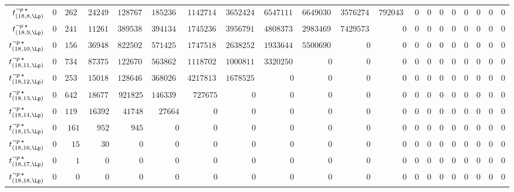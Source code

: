 \begin{tabular}{r|rrrrrrrrrrrrrrrrrrr}
  $t^{\neg p \, \star}_{(18,8,\Lp)}$ & $0$ & $262171$ & $242493998$ & $12876768081$ & $185236211948$ & $1142714990240$ & $3652424436036$ & $6547111209163$ & $6649030529816$ & $3576274175646$ & $792043926300$ & $0$ & $0$ & $0$ & $0$ & $0$ & $0$ & $0$ & $0$ \\
  $t^{\neg p \, \star}_{(18,9,\Lp)}$ & $0$ & $241011$ & $112613104$ & $3895382535$ & $39413459324$ & $174523685160$ & $395679143724$ & $480837309029$ & $298346954392$ & $74295734409$ & $0$ & $0$ & $0$ & $0$ & $0$ & $0$ & $0$ & $0$ & $0$ \\
  $t^{\neg p \, \star}_{(18,10,\Lp)}$ & $0$ & $156446$ & $36948668$ & $822502023$ & $5714250772$ & $17475187350$ & $26382522396$ & $19336444092$ & $5500690560$ & $0$ & $0$ & $0$ & $0$ & $0$ & $0$ & $0$ & $0$ & $0$ & $0$ \\
  $t^{\neg p \, \star}_{(18,11,\Lp)}$ & $0$ & $73472$ & $8737572$ & $122670621$ & $563862860$ & $1118702910$ & $1000811484$ & $332025078$ & $0$ & $0$ & $0$ & $0$ & $0$ & $0$ & $0$ & $0$ & $0$ & $0$ & $0$ \\
  $t^{\neg p \, \star}_{(18,12,\Lp)}$ & $0$ & $25305$ & $1501890$ & $12864672$ & $36802672$ & $42178130$ & $16785252$ & $0$ & $0$ & $0$ & $0$ & $0$ & $0$ & $0$ & $0$ & $0$ & $0$ & $0$ & $0$ \\
  $t^{\neg p \, \star}_{(18,13,\Lp)}$ & $0$ & $6427$ & $186776$ & $921825$ & $1463396$ & $727675$ & $0$ & $0$ & $0$ & $0$ & $0$ & $0$ & $0$ & $0$ & $0$ & $0$ & $0$ & $0$ & $0$ \\
  $t^{\neg p \, \star}_{(18,14,\Lp)}$ & $0$ & $1196$ & $16392$ & $41748$ & $27664$ & $0$ & $0$ & $0$ & $0$ & $0$ & $0$ & $0$ & $0$ & $0$ & $0$ & $0$ & $0$ & $0$ & $0$ \\
  $t^{\neg p \, \star}_{(18,15,\Lp)}$ & $0$ & $161$ & $952$ & $945$ & $0$ & $0$ & $0$ & $0$ & $0$ & $0$ & $0$ & $0$ & $0$ & $0$ & $0$ & $0$ & $0$ & $0$ & $0$ \\
  $t^{\neg p \, \star}_{(18,16,\Lp)}$ & $0$ & $15$ & $30$ & $0$ & $0$ & $0$ & $0$ & $0$ & $0$ & $0$ & $0$ & $0$ & $0$ & $0$ & $0$ & $0$ & $0$ & $0$ & $0$ \\
  $t^{\neg p \, \star}_{(18,17,\Lp)}$ & $0$ & $1$ & $0$ & $0$ & $0$ & $0$ & $0$ & $0$ & $0$ & $0$ & $0$ & $0$ & $0$ & $0$ & $0$ & $0$ & $0$ & $0$ & $0$ \\
  $t^{\neg p \, \star}_{(18,18,\Lp)}$ & $0$ & $0$ & $0$ & $0$ & $0$ & $0$ & $0$ & $0$ & $0$ & $0$ & $0$ & $0$ & $0$ & $0$ & $0$ & $0$ & $0$ & $0$ & $0$ \\
\end{tabular}
